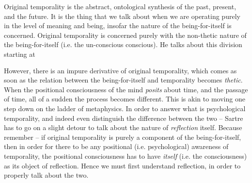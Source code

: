 Original temporality is the abstract, ontological synthesis of the past, present, and the future.
It is the thing that we talk about when we are operating purely in the level of meaning and being, insofar the nature of the being-for-itself is concerned. Original temporality is concerned purely with the non-thetic nature of the being-for-itself (i.e. the un-conscious conscious). He talks about this division starting at \autocite[217]{sartre}

However, there is an impure derivative of original temporality, which comes as soon as the relation between the being-for-itself and temporality becomes \emph{thetic}. When the positional consciousness of the mind \emph{posits} about time, and the passage of time, all of a sudden the process becomes different. This is akin to moving one step down on the ladder of metaphysics. In order to answer what is psychological temporality, and indeed even distinguish the difference between the two -- Sartre has to go on a slight detour to talk about the nature of \emph{reflection} itself. Because remember -- if original temporality is purely a component of the being-for-itself, then in order for there to be any positional (i.e. psychological) awareness of temporality, the positional consciousness has to have \emph{itself} (i.e. the consciousness) as its object of reflection. Hence we must first understand reflection, in order to properly talk about the two.

